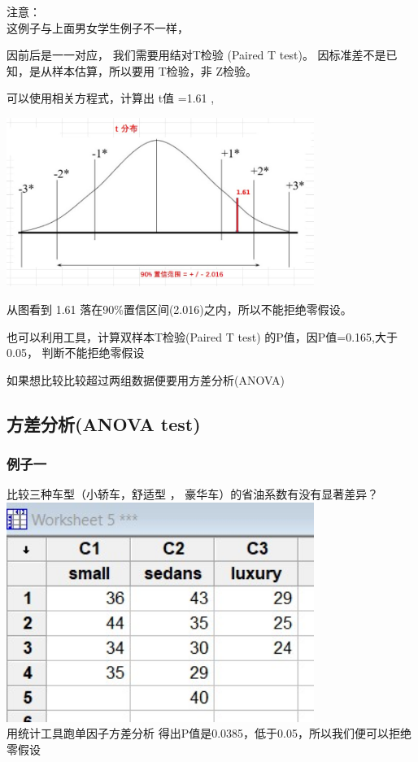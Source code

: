注意：\\

这例子与上面男女学生例子不一样，

因前后是一一对应， 我们需要用结对T检验 (Paired T test)。
因标准差不是已知，是从样本估算，所以要用 T检验，非 Z检验。

可以使用相关方程式，计算出 t值 =1.61 ,


\includegraphics[width=10cm]{CholesterolEg2022-07-23_195121.jpg}

从图看到 1.61 落在90\%置信区间(2.016)之内，所以不能拒绝零假设。

也可以利用工具，计算双样本T检验(Paired T test)
的P值，因P值=0.165,大于0.05， 判断不能拒绝零假设

如果想比较比较超过两组数据便要用方差分析(ANOVA)

\hypertarget{ux65b9ux5deeux5206ux67901-anova-test}{%
\subsection{方差分析(ANOVA
test)}\label{ux65b9ux5deeux5206ux67901-anova-test}}

\hypertarget{ux65b9ux5deeux5206ux67902-anova-test}{%
\subsubsection{例子一}\label{ux65b9ux5deeux5206ux67902-anova-test}}

比较三种车型（小轿车，舒适型 ， 豪华车）的省油系数有没有显著差异？\\
\includegraphics[width=10cm]{5anovaDataScreenshot_2022-07-24_105955.jpg}\\
用统计工具跑单因子方差分析
得出P值是0.0385，低于0.05，所以我们便可以拒绝零假设 

